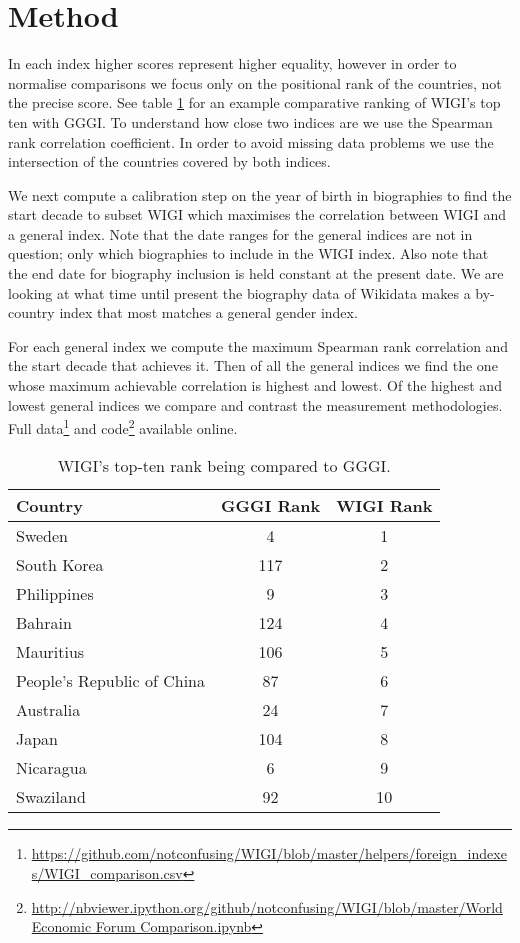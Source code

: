 \documentclass{sig-alternate}
\begin{document}
\section{Method}

In each index higher scores represent higher equality, however in order to normalise comparisons we focus only on the positional rank of the countries, not the precise score. See table \ref{table:topten} for an example comparative ranking of WIGI's top ten with GGGI. To understand how close two indices are we use the Spearman rank correlation coefficient. In order to avoid missing data problems we use the intersection of the countries covered by both indices. 

We next compute a calibration step on the year of birth in biographies to find the start decade to subset WIGI which maximises the correlation between WIGI and a general index. Note that the date ranges for the general indices are not in question; only which biographies to include in the WIGI index. Also note that the end date for biography inclusion is held constant at the present date. We are looking at what time until present the biography data of Wikidata makes a by-country index that most matches a general gender index.

For each general index we compute the maximum Spearman rank correlation and the start decade that achieves it. Then of all the general indices we find the one whose maximum achievable correlation is highest and lowest. Of the highest and lowest general indices we compare and contrast the measurement methodologies. 
Full data\footnote{\url{https://github.com/notconfusing/WIGI/blob/master/helpers/foreign_indexes/WIGI_comparison.csv}}
 and code\footnote{\url{http://nbviewer.ipython.org/github/notconfusing/WIGI/blob/master/World
 Economic Forum Comparison.ipynb}} available online.
\begin{table}
\caption{WIGI's top-ten rank being compared to GGGI.}
\label{table:topten}
\begin{tabular}{|l|c|c|}
\hline
Country &
GGGI Rank &
WIGI Rank \\\hline
Sweden &
4 &
1 \\\hline
South Korea &
117 &
2 \\\hline
Philippines &
9 &
3 \\\hline
Bahrain &
124 &
4 \\\hline
Mauritius &
106 &
5 \\\hline
People's Republic of China &
87 &
6 \\\hline
Australia &
24 &
7 \\\hline
Japan &
104 &
8 \\\hline
Nicaragua &
6 &
9 \\\hline
Swaziland &
92 &
10 \\\hline
\end{tabular}
\end{table}
\end{document}
